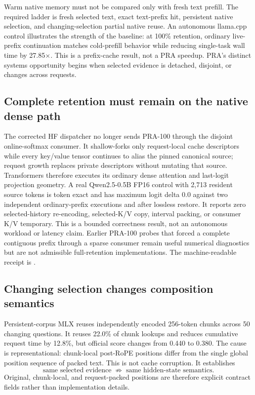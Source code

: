 \documentclass[11pt]{article}
\begin{document}
Warm native memory must not be compared only with fresh text prefill.  The
required ladder is fresh selected text, exact text-prefix hit, persistent native
selection, and changing-selection partial native reuse.  An autonomous
llama.cpp control illustrates the strength of the baseline: at 100\% retention,
ordinary live-prefix continuation matches cold-prefill behavior while reducing
single-task wall time by 27.85$\times$.  This is a prefix-cache result, not a PRA
speedup.  PRA's distinct systems opportunity begins when selected evidence is
detached, disjoint, or changes across requests.

\subsection{Complete retention must remain on the native dense path}

The corrected HF dispatcher no longer sends PRA-100 through the disjoint
online-softmax consumer.  It shallow-forks only request-local cache descriptors
while every key/value tensor continues to alias the pinned canonical source;
request growth replaces private descriptors without mutating that source.
Transformers therefore executes its ordinary dense attention and last-logit
projection geometry.  A real Qwen2.5-0.5B FP16 control with 2,713 resident
source tokens is token exact and has maximum logit delta 0.0 against two
independent ordinary-prefix executions and after lossless restore.  It reports
zero selected-history re-encoding, selected-K/V copy, interval packing, or
consumer K/V temporary.  This is a bounded correctness result, not an
autonomous workload or latency claim.  Earlier PRA-100 probes that forced a
complete contiguous prefix through a sparse consumer remain useful numerical
diagnostics but are not admissible full-retention implementations.  The
machine-readable receipt is
.

\subsection{Changing selection changes composition semantics}

Persistent-corpus MLX reuses independently encoded 256-token chunks across 50
changing questions.  It reuses 22.0\% of chunk lookups and reduces cumulative
request time by 12.8\%, but official score changes from 0.440 to 0.380.  The
cause is representational: chunk-local post-RoPE positions differ from the
single global position sequence of packed text.  This is not cache corruption.
It establishes
\[
\boxed{\text{same selected evidence}\;\not\Rightarrow\;
\text{same hidden-state semantics}.}
\]
Original, chunk-local, and request-packed positions are therefore explicit
contract fields rather than implementation details.
\end{document}
